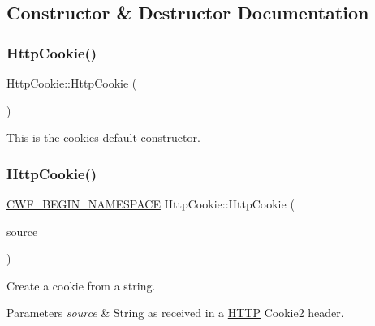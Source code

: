 \subsection{Constructor \& Destructor Documentation}
\mbox{\label{class_http_cookie_a728bef99b74d352b1762cc98e67cc93c}} 
\subsubsection{\texorpdfstring{Http\+Cookie()}{HttpCookie()}\hspace{0.1cm}{\footnotesize\ttfamily [1/3]}}
{\footnotesize\ttfamily Http\+Cookie\+::\+Http\+Cookie (\begin{DoxyParamCaption}{ }\end{DoxyParamCaption})\hspace{0.3cm}{\ttfamily [default]}}



This is the cookie\textquotesingle{}s default constructor. 

\mbox{\label{class_http_cookie_aeb0f2cb5f7e8ef2fc7503663e29941c4}} 
\subsubsection{\texorpdfstring{Http\+Cookie()}{HttpCookie()}\hspace{0.1cm}{\footnotesize\ttfamily [2/3]}}
{\footnotesize\ttfamily \hyperlink{cppwebframework__global_8h_a7492e9498cbaf9cd17dbc2215d3a0e48}{C\+W\+F\+\_\+\+B\+E\+G\+I\+N\+\_\+\+N\+A\+M\+E\+S\+P\+A\+CE} Http\+Cookie\+::\+Http\+Cookie (\begin{DoxyParamCaption}\item[{const Q\+Byte\+Array \&}]{source }\end{DoxyParamCaption})\hspace{0.3cm}{\ttfamily [explicit]}}

Create a cookie from a string. 
\begin{DoxyParams}{Parameters}
{\em source} & String as received in a \hyperlink{namespace_h_t_t_p}{H\+T\+TP} Cookie2 header. \\
\hline
\end{DoxyParams}
\mbox{\label{class_http_cookie_a2037d1e3f9a6f65f0f3575df1cfcc200}} 

